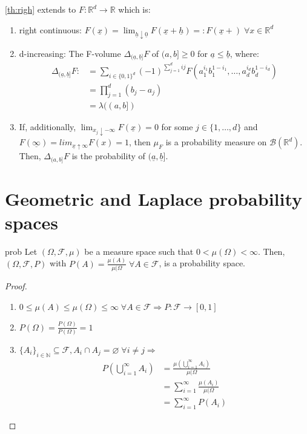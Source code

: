 \documentclass{article}
\begin{document}
	\begin{myrem}{}{}
		\ref{th:righ} extends to $F : \mathbb{R}^d\to\mathbb{R}$ which is:
		\begin{enumerate}[label=(\roman*)]
			\item right continuous: $F(\underline{x})=\lim_{\underline{h}\downarrow\underline{0}}F(\underline{x}+\underline{h})=:F(\underline{x}+)\;\forall x\in\mathbb{R}^d$
			\item d-increasing: The F-volume $\Delta_{(\underline{a}, \underline{b}]}F$ of $(a, b]\geq0$ for $\underline{a}\leq\underline{b}$, where:
			\begin{align*}
				\Delta_{(\underline{a}, \underline{b}]}F:&=\sum_{i\in\{0, 1\}^d}(-1)^{\sum_{j=1}^{d}ij}F(a_1^{i_1}b_1^{1-i_1}, \dots, a_d^{i_d}b_d^{1-i_d})\\
				&=\prod_{j=1}^{d}(b_j-a_j)\\
				&=\lambda((a, b])
			\end{align*}
			\item If, additionally, $\lim_{x_j\downarrow-\infty}F(\underline{x})=0$ for some $j\in\{1, \dots, d\}$ and $F(\underline{\infty})=lim_{\underline{x}\uparrow\infty}F(x)=1$, then $\mu_F$ is a probability measure on $\mathcal{B}(\mathbb{R}^d)$. Then, $\Delta_{(a, b]}F$ is the probability of $(\underline{a}, \underline{b}]$.
		\end{enumerate}
	\end{myrem}
	
	\newpage
	\section{Geometric and Laplace probability spaces}
	
	\begin{myprop}{}{prob}
		Let $(\Omega, \mathcal{F}, \mu)$ be a measure space such that $0<\mu(\Omega)<\infty$. Then, $(\Omega, \mathcal{F}, P)$ with $P(A)=\frac{\mu(A)}{\mu(\Omega}\;\forall A\in\mathcal{F}$, is a probability space. 
		
		\begin{proof}~\\
			\begin{enumerate}[label=(\roman*)]
				\item $0\leq\mu(A)\leq\mu(\Omega)\leq\infty\;\forall A\in\mathcal{F}\Rightarrow P : \mathcal{F}\to[0, 1]$
				\item $P(\Omega)=\frac{P(\Omega)}{P(\Omega)}=1$
				\item $\{A_i\}_{i\in\mathbb{N}}\subseteq\mathcal{F}, A_i\cap A_j=\varnothing\;\forall i\neq j\Rightarrow$
				\begin{align*}
					P(\bigcup_{i=1}^{\infty}A_i)&=\frac{\mu(\bigcup_{i=1}^{\infty}A_i)}{\mu(\Omega}\\
					&=\sum_{i=1}^{\infty}\frac{\mu(A_i)}{\mu(\Omega}\\
					&=\sum_{i=1}^{\infty}P(A_i)
				\end{align*}
			\end{enumerate}
		\end{proof}
	\end{myprop}
	
\end{document}
